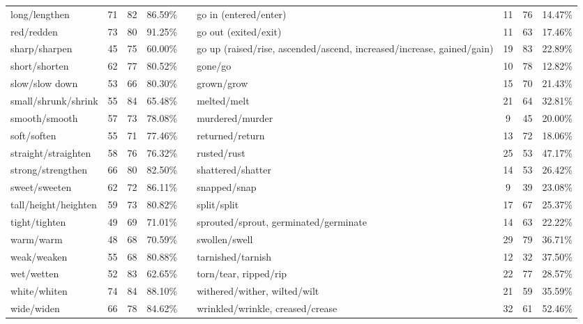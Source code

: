 \begin{tabular}{p{3cm}ccccp{3cm}ccc}
long/lengthen & 71 & 82 & 86.59\% & & go in (entered/enter) & 11 & 76 & 14.47\% \\
red/redden & 73 & 80 & 91.25\% & & go out (exited/exit) & 11 & 63 & 17.46\% \\
sharp/sharpen & 45 & 75 & 60.00\% & & go up (raised/rise, ascended/ascend, increased/increase, gained/gain) & 19 & 83 & 22.89\% \\
short/shorten & 62 & 77 & 80.52\% & & gone/go & 10 & 78 & 12.82\% \\
slow/slow down & 53 & 66 & 80.30\% & & grown/grow & 15 & 70 & 21.43\% \\
small/shrunk/shrink & 55 & 84 & 65.48\% & & melted/melt & 21 & 64 & 32.81\% \\
smooth/smooth & 57 & 73 & 78.08\% & & murdered/murder & 9 & 45 & 20.00\% \\
soft/soften & 55 & 71 & 77.46\% & & returned/return & 13 & 72 & 18.06\% \\
straight/straighten & 58 & 76 & 76.32\% & & rusted/rust & 25 & 53 & 47.17\% \\
strong/strengthen & 66 & 80 & 82.50\% & & shattered/shatter & 14 & 53 & 26.42\% \\
sweet/sweeten & 62 & 72 & 86.11\% & & snapped/snap & 9 & 39 & 23.08\% \\
tall/height/heighten & 59 & 73 & 80.82\% & & split/split & 17 & 67 & 25.37\% \\
tight/tighten & 49 & 69 & 71.01\% & & sprouted/sprout, germinated/germinate & 14 & 63 & 22.22\% \\
warm/warm & 48 & 68 & 70.59\% & & swollen/swell & 29 & 79 & 36.71\% \\
weak/weaken & 55 & 68 & 80.88\% & & tarnished/tarnish & 12 & 32 & 37.50\% \\
wet/wetten & 52 & 83 & 62.65\% & & torn/tear, ripped/rip & 22 & 77 & 28.57\% \\
white/whiten & 74 & 84 & 88.10\% & & withered/wither, wilted/wilt & 21 & 59 & 35.59\% \\
wide/widen & 66 & 78 & 84.62\% & & wrinkled/wrinkle, creased/crease & 32 & 61 & 52.46\%
\end{tabular}
